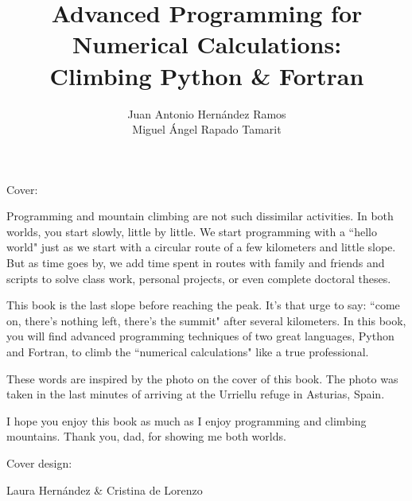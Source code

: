 \documentclass[a4paper,10pt,twoside,english]{book}
\title{{\fontsize{27}{33}\selectfont Advanced Programming for \\ Numerical Calculations: 
	 \\  \vspace{0.8cm} } 
	 {\fontsize{27}{33}\selectfont Climbing Python \& Fortran\\ }
	 }
\author{ Juan Antonio Hern\'andez Ramos\\ 	
  	         Miguel \'Angel Rapado Tamarit\\
            \vspace{5cm} } %
\date{  } %
\begin{document}
 
  
   
    \maketitle
    \thispagestyle{empty}   %
    
    
    \noindent  Cover: 
    \vspace{0.2cm}
    
    \noindent Programming and mountain climbing are not such dissimilar activities. 
    In both worlds, you start slowly, little by little. 
    We start programming with a ``hello world" just as we start 
    with a circular route of a few kilometers and little slope.
     But as time goes by, we add time spent in routes with family and friends 
     and scripts to solve class work, personal projects, or even complete doctoral theses.
    
    This book is the last slope before reaching the peak. 
    It's that urge to say: ``come on, there's nothing left, there's the summit" after several kilometers. 
    In this book, you will find advanced programming techniques of two great languages, 
    Python and Fortran, to climb the ``numerical calculations" like a true professional.
    
    These words are inspired by the photo on the cover of this book. The photo was taken in the last minutes of arriving at the Urriellu 
    refuge in Asturias, Spain.
    
    I hope you enjoy this book as much as I enjoy programming and climbing mountains. 
    Thank you, dad, for showing me both worlds.
    
    \vspace{1cm}
    \noindent Cover design: 
    \vspace{0.2cm}
    
    \noindent Laura Hernández \& Cristina de Lorenzo
   
\end{document}
